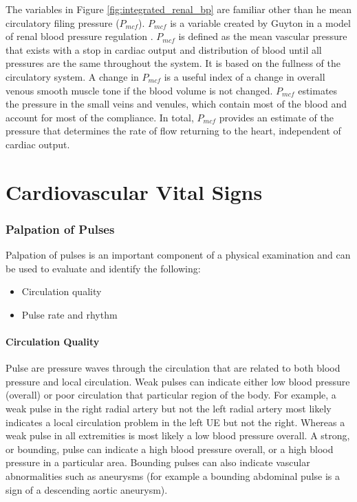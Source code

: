 The variables in Figure \ref{fig:integrated_renal_bp} are familiar other than he mean circulatory filing pressure ($P_{mcf}$). $P_{mcf}$ is a variable created by Guyton in a model of renal blood pressure regulation \cite{rothe_mean_1993}. $P_{mcf}$ is defined as the mean vascular pressure that exists with a stop in cardiac output and distribution of blood until all pressures are the same throughout the system. It is based on the fullness of the circulatory system. A change in $P_{mcf}$ is a useful index of a change in overall venous smooth muscle tone if the blood volume is not changed. $P_{mcf}$ estimates the pressure in the small veins and venules, which contain most of the blood and account for most of the compliance. In total, $P_{mcf}$ provides an estimate of the pressure that determines the rate of flow returning to the heart, independent of cardiac output.

\newpage
\section{Cardiovascular Vital Signs}

\subsubsection{Palpation of Pulses} 
Palpation of pulses is an important component of a physical examination and can be used to evaluate and identify the following:

\begin{itemize}
\item Circulation quality
\item Pulse rate and rhythm
\end{itemize}

\paragraph{Circulation Quality}

Pulse are pressure waves through the circulation that are related to both blood pressure and local circulation. Weak pulses can indicate either low blood pressure (overall) or poor circulation that particular region of the body. For example, a weak pulse in the right radial artery but not the left radial artery most likely indicates a local circulation problem in the left UE but not the right. Whereas a weak pulse in all extremities is most likely a low blood pressure overall. A strong, or bounding, pulse can indicate a high blood pressure overall, or a high blood pressure in a particular area. Bounding pulses can also indicate vascular abnormalities such as aneurysms (for example a bounding abdominal pulse is a sign of a descending aortic aneurysm).

